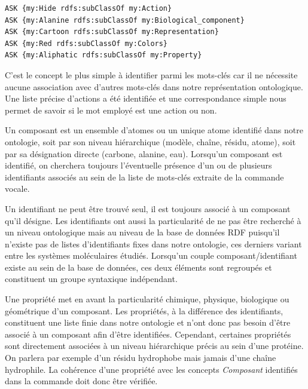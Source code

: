 \begin{lstlisting}[language=XML, caption=\textit{Requêtes SPARQL effectuées pour tester la nature des mots-clés entrés par l'utilisateur}, label=sparql_cmd]
ASK {my:Hide rdfs:subClassOf my:Action}
ASK {my:Alanine rdfs:subClassOf my:Biological_component}
ASK {my:Cartoon rdfs:subClassOf my:Representation}
ASK {my:Red rdfs:subClassOf my:Colors}
ASK {my:Aliphatic rdfs:subClassOf my:Property}
\end{lstlisting}


C'est le concept le plus simple à identifier parmi les mots-clés car il ne nécessite aucune association avec d'autres mots-clés dans notre représentation ontologique. Une liste précise d'actions a été identifiée et une correspondance simple nous permet de savoir si le mot employé est une action ou non.


Un composant est un ensemble d'atomes ou un unique atome identifié dans notre ontologie, soit par son niveau hiérarchique (modèle, chaîne, résidu, atome), soit par sa désignation directe (carbone, alanine, eau). Lorsqu'un composant est identifié, on cherchera toujours l'éventuelle présence d'un ou de plusieurs identifiants associés au sein de la liste de mots-clés extraite de la commande vocale.


Un identifiant ne peut être trouvé seul, il est toujours associé à un composant qu'il désigne. Les identifiants ont aussi la particularité de ne pas être recherché à un niveau ontologique mais au niveau de la base de données RDF puisqu'il n'existe pas de listes d'identifiants fixes dans notre ontologie, ces derniers variant entre les systèmes moléculaires étudiés. Lorsqu'un couple composant/identifiant existe au sein de la base de données, ces deux éléments sont regroupés et constituent un groupe syntaxique indépendant.


Une propriété met en avant la particularité chimique, physique, biologique ou géométrique d'un composant. Les propriétés, à la différence des identifiants, constituent une liste finie dans notre ontologie et n'ont donc pas besoin d'être associé à un composant afin d'être identifiées. Cependant, certaines propriétés sont directement associées à un niveau hiérarchique précis au sein d'une protéine. On parlera par exemple d'un résidu hydrophobe mais jamais d'une chaîne hydrophile. La cohérence d'une propriété avec les concepts \textit{Composant} identifiés dans la commande doit donc être vérifiée. 

